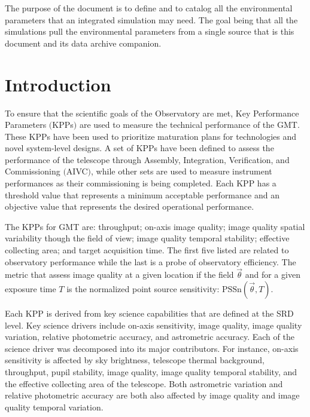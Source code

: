 \documentclass{gmto}
\def\PSSn{\ensuremath{\mathrm{PSSn}\left( \vec\theta,T \right)}}
\begin{document}
The purpose of the document is to define and to catalog all the environmental
parameters that an integrated simulation may need.
The goal being that all the simulations pull the environmental parameters from a
single source that is this document and its data archive companion.

\section{Introduction}
\label{sec:introduction}

To ensure that the scientific goals of the Observatory are met, Key Performance
Parameters $($KPPs$)$ are used to measure the technical performance of the GMT.
These KPPs have been used to prioritize maturation plans for technologies and
novel system-level designs.
A set of KPPs have been defined to assess the performance of the telescope
through Assembly, Integration, Verification, and Commissioning $($AIVC$)$, while
other sets are used to measure instrument performances as their commissioning is
being completed.
Each KPP has a threshold value that represents a minimum acceptable performance and an objective value that represents the desired operational performance. 

The KPPs for GMT are: throughput; on-axis image quality; image quality spatial
variability though the field of view; image quality temporal stability;
effective collecting area; and target acquisition time. The first five listed
are related to observatory performance while the last is a probe of observatory
efficiency. The metric that assess image quality at a given location if the
field $\vec\theta$ and for a given exposure time $T$ is the normalized point
source sensitivity: \PSSn.

Each KPP is derived from key science capabilities that are defined at the SRD
level. Key science drivers include on-axis sensitivity, image quality, image
quality variation, relative photometric accuracy, and astrometric accuracy.
Each of the science driver was decomposed into its major contributors.
For instance, on-axis sensitivity is affected by sky brightness, telescope
thermal background, throughput, pupil stability, image quality, image quality
temporal stability, and the effective collecting area of the telescope.
Both astrometric variation and relative photometric accuracy are both also
affected by image quality and image quality temporal variation. 
\end{document}
